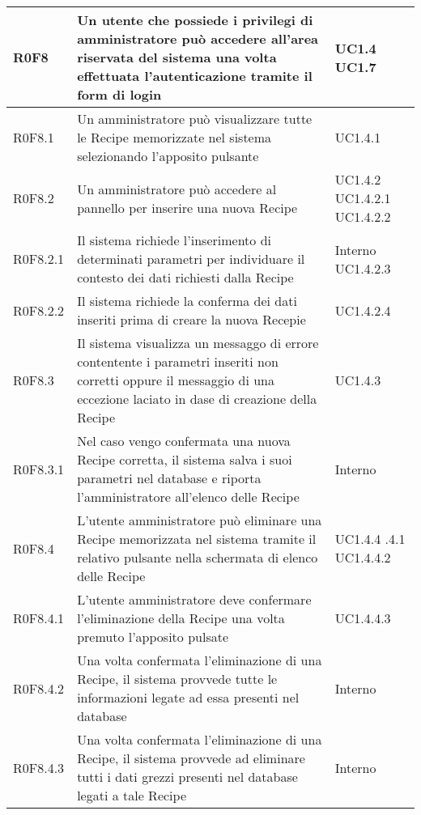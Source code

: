 \begin{center}
\begin{longtable}{| p{2cm} | p{8cm} | p{2cm} |}
		\hline
		R0F8  &  Un utente che possiede i privilegi di amministratore può accedere all'area riservata del sistema una volta effettuata l'autenticazione tramite il form di login  &  UC1.4 \newline UC1.7 \\
		\hline
		R0F8.1  &  Un amministratore può visualizzare tutte le Recipe memorizzate nel sistema selezionando l'apposito pulsante  &  UC1.4.1 \\
		\hline
		R0F8.2  &  Un amministratore può accedere al pannello per inserire una nuova Recipe  &  UC1.4.2 \newline UC1.4.2.1 \newline UC1.4.2.2  \\
		\hline
		R0F8.2.1  &  Il sistema richiede l'inserimento di determinati parametri per individuare il contesto dei dati richiesti dalla Recipe  &  Interno \newline UC1.4.2.3 \\
		\hline
		R0F8.2.2  &  Il sistema richiede la conferma dei dati inseriti prima di creare la nuova Recepie  &  UC1.4.2.4 \\
		\hline
		R0F8.3  &  Il sistema visualizza un messaggo di errore contentente i parametri inseriti non corretti oppure il messaggio di una eccezione laciato in dase di creazione della Recipe  &  UC1.4.3 \\
		\hline
		R0F8.3.1  &  Nel caso vengo confermata  una nuova Recipe corretta, il sistema salva i suoi parametri nel database  e riporta l'amministratore all'elenco delle Recipe  &  Interno \\
		\hline
		R0F8.4  &  L'utente amministratore può eliminare una Recipe memorizzata nel sistema tramite il relativo pulsante nella schermata di elenco delle Recipe  &  UC1.4.4 \newline 1.4.4.1 \newline UC1.4.4.2 \\
		\hline
		R0F8.4.1  &  L'utente amministratore deve confermare l'eliminazione della Recipe una volta premuto l'apposito pulsate  &  UC1.4.4.3 \\
		\hline
		R0F8.4.2  &  Una volta confermata l'eliminazione di una Recipe, il sistema provvede tutte le informazioni legate ad essa presenti nel database  &  Interno \\
		\hline
		R0F8.4.3  &  Una volta confermata l'eliminazione di una Recipe, il sistema provvede ad eliminare tutti i dati grezzi presenti nel database legati a tale Recipe  &  Interno \\
		\hline

\end{longtable}
\end{center}
